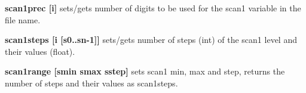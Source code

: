 \begin{DoxyItemize}
\item {\bfseries scan1prec \mbox{[}i\mbox{]}} sets/gets number of digits to be used for the scan1 variable in the file name.
\end{DoxyItemize}


\begin{DoxyItemize}
\item {\bfseries scan1steps \mbox{[}i \mbox{[}s0..sn-\/1\mbox{]}\mbox{]}} sets/gets number of steps (int) of the scan1 level and their values (float).
\end{DoxyItemize}


\begin{DoxyItemize}
\item {\bfseries scan1range \mbox{[}smin smax sstep\mbox{]}} sets scan1 min, max and step, returns the number of steps and their values as scan1steps. 
\end{DoxyItemize}